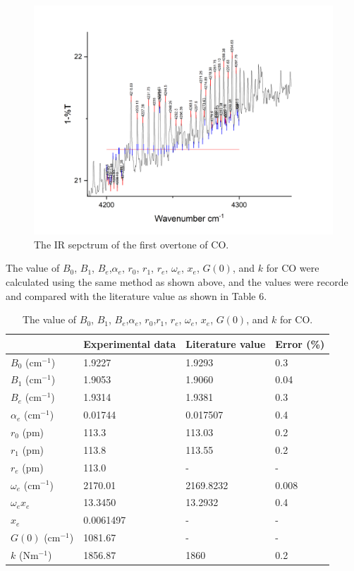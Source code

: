\documentclass[twocolumn]{article} %
\begin{document}
\begin{figure}[h!]
    \centering
    \includegraphics[width=\columnwidth]{CO-1st overtone.png}
    \caption{The IR sepctrum of the first overtone of CO.}
    \label{COover}
\end{figure}
\vspace{0.2in}


The value of $B_0$, $B_1$, $B_e$,$\alpha_e$, $r_0$, $r_1$, $r_e$, $\omega_e$, $x_e$, $G(0)$, and $k$ for CO were calculated using the same method as shown above, and the values were recorde and compared with the literature value as shown in Table 6. 

\begin{table}[h]
    \caption{The value of $B_0$, $B_1$, $B_e$,$\alpha_e$, $r_0$,$r_1$, $r_e$, $\omega_e$, $x_e$, $G(0)$, and $k$ for CO.}
    \begin{tabular}{L{0.9in}C{0.7in}C{0.7in}C{0.7in}}\toprule
          & Experimental data & Literature value & Error (\%) \\\midrule
        $B_0$ (cm$^{-1}$)& 1.9227 & 1.9293 \cite{CO-2} & 0.3\\
        $B_1$ (cm$^{-1}$)& 1.9053 & 1.9060 \cite{CO-2} & 0.04\\
        $B_e$ (cm$^{-1}$)& 1.9314 & 1.9381 \cite{CO-2}&0.3\\
        $\alpha_e$ (cm$^{-1}$)& 0.01744 & 0.017507 \cite{CO} &0.4\\
        $r_0$ (pm)& 113.3 & 113.03 \cite{CO-2} &0.2\\
        $r_1$ (pm)& 113.8 & 113.55\cite{CO-2} &0.2\\
        $r_e$ (pm)& 113.0 & - &-\\
        $\omega_e$ (cm$^{-1}$)& 2170.01 &  2169.8232 \cite{CO} &0.008\\
        $\omega_e x_e$ & 13.3450 & 13.2932 \cite{CO} & 0.4\\
        $x_e$ & 0.0061497 & - & - \\
        $G(0)$ (cm$^{-1}$)& 1081.67 & - &-\\
        $k$ (Nm$^{-1}$)& 1856.87 & 1860 \cite{HClbook} & 0.2\\\bottomrule
    \end{tabular}
\end{table}
\end{document}
